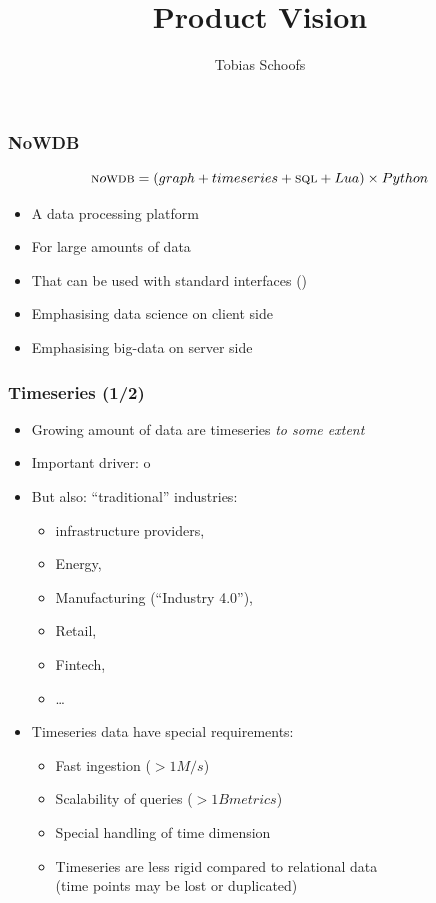 \documentclass[mathserif,usenames,dvipsnames]{beamer}
\title{Product Vision}
\author{Tobias Schoofs}
\begin{document}
\frame{\titlepage}

\begin{frame}
\frametitle{NoWDB}
\begin{equation*}
\textsc{n}o\textsc{wdb} = (graph +  timeseries + \textsc{sql} + Lua) \times Python
\end{equation*}
\begin{itemize}
\item A data processing platform
\item For large amounts of  data
\item That can be used with standard interfaces ()
\item Emphasising data science on client side
\item Emphasising big-data on server side
\end{itemize}
\end{frame}

\begin{frame}
\frametitle{Timeseries (1/2)}
\begin{itemize}
\item Growing amount of data are timeseries \emph{to some extent}
\item Important driver: o
\item But also: ``traditional'' industries:
      \begin{itemize} 
      \item {} infrastructure providers,
      \item Energy,
      \item Manufacturing (``Industry 4.0''),
      \item Retail,
      \item Fintech,
      \item \dots
      \end{itemize}
\item Timeseries data have special requirements:
      \begin{itemize}
      \item Fast ingestion ($> 1M/s$)
      \item Scalability of queries ($> 1B metrics$)
      \item Special handling of time dimension
      \item Timeseries are less rigid compared to relational data\\
            (time points may be lost or duplicated)
      \end{itemize}
\end{itemize}
\end{frame}
\end{document}
